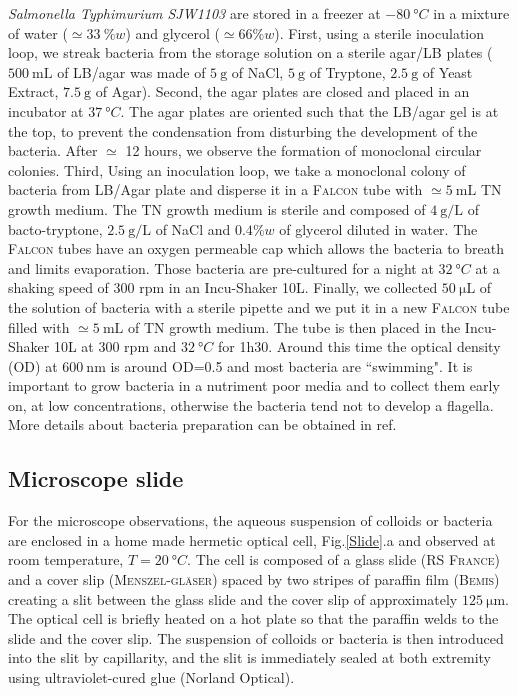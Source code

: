 \documentclass[%
 aip,
 jmp,%
 amsmath,amssymb,
reprint,%
]{revtex4-1}
\newcommand{\tg}[1]{{\color{magenta}#1}} %
\begin{document}
\textit{Salmonella Typhimurium SJW1103}  are stored in a freezer at $\SI{-80}{\degree C}$ in a mixture of water ($\simeq \SI{33}{\%} w$) and glycerol ($\simeq 66\% w$). First, using a sterile inoculation loop, we streak bacteria from the storage solution on a sterile agar/LB plates  ($\SI{500}{\milli\liter}$ of LB/agar was made of $\SI{5}{\gram}$ of NaCl, $\SI{5}{\gram}$ of Tryptone, $\SI{2.5}{\gram}$ of Yeast Extract, $\SI{7.5}{\gram}$ of Agar). Second, the agar plates are closed and placed in an incubator at $\SI{37}{\degree C}$. The agar plates are oriented such that the LB/agar gel is at the top, to prevent the condensation from disturbing the development of the bacteria. After $\simeq$ 12 hours, we observe the formation of monoclonal circular colonies. Third, Using an inoculation loop, we take a monoclonal colony of bacteria from LB/Agar plate and disperse it in a \textsc{Falcon} tube with $\simeq \SI{5}{\milli\liter}$ TN growth medium. The TN growth medium is sterile and composed of $\SI{4}{\gram\per\liter}$ of bacto-tryptone, $\SI{2.5}{\gram\per\liter}$ of NaCl and $0.4\% w$ of glycerol diluted in water. The \textsc{Falcon} tubes have an oxygen permeable cap which allows the bacteria to breath and limits evaporation. Those bacteria are pre-cultured for a night at $\SI{32}{\degree C}$ \tg{at a shaking speed of} 300 rpm in an Incu-Shaker 10L. Finally, we collected $\SI{50}{\micro\liter}$ of the solution of bacteria with a sterile pipette and we put it in a new \textsc{Falcon} tube filled with $\simeq \SI{5}{\milli\liter}$ of TN growth medium. The tube is then placed in the Incu-Shaker 10L at 300 rpm and $\SI{32}{\degree C}$ for 1h30. Around this time the optical density (OD) at $\SI{600}{\nano\meter}$ is around OD=0.5 and most bacteria are ``swimming". It is important to grow bacteria in a nutriment poor media and to collect them early on, at low concentrations, otherwise the bacteria tend not to develop a flagella. More details about bacteria preparation can be obtained in ref\cite{Schwarz2015, ajp2010hagen, XXX}.

\subsection{Microscope slide}
For the microscope observations, the aqueous suspension of colloids or bacteria are enclosed in a home made hermetic optical cell, Fig.\ref{Slide}.a and observed at room temperature, $T=\SI{20}{\degree C}$. The cell is composed of a  glass slide (\textsc{RS France}) and a cover slip (\textsc{Menszel-gl\"aser}) spaced by two stripes of paraffin film (\textsc{Bemis}) \tg{creating a slit between the glass slide and the cover slip of approximately $\SI{125}{\micro\meter}$}. The optical cell is briefly heated on a hot plate so that the paraffin welds to the slide and the cover slip. The suspension of colloids or bacteria is then introduced into the slit by capillarity, and the slit is immediately sealed at both extremity using ultraviolet-cured glue (Norland Optical).
\end{document}

